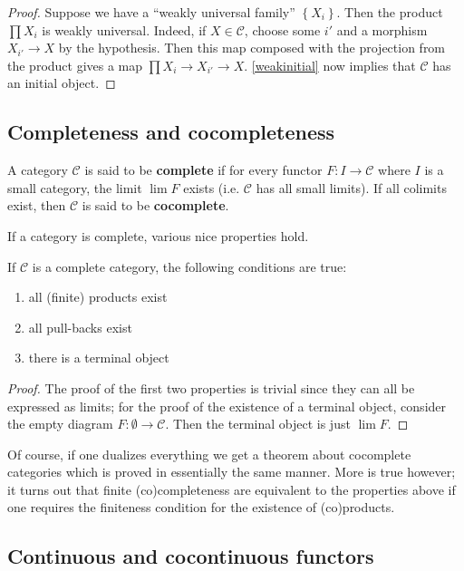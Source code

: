 \begin{proposition}
\begin{proof}
Suppose we have a ``weakly universal family'' $\left\{X_i\right\}$. Then the
product $\prod X_i$ is weakly universal. Indeed, if $X \in \mathcal{C}$,
choose some $i'$ and a morphism $X_{i'} \to X$ by the hypothesis. Then this map
composed with the projection from the product gives a map  $\prod X_i \to
X_{i'} \to X$.
\cref{weakinitial} now implies that $\mathcal{C}$ has an initial object.
\end{proof}

\subsection{Completeness and cocompleteness}
\begin{definition}\label{completecat} A category $\mathcal{C}$ is said to be \textbf{complete} if for every
functor $F:I\rightarrow \mathcal{C}$ where $I$ is a small category, the limit
$\lim F$ exists (i.e. $\mathcal{C}$ has all small limits). If all colimits exist, then $\mathcal{C}$ is said to be
\textbf{cocomplete}.
\end{definition}

If a category is complete, various nice properties hold.
\begin{proposition} If $\mathcal{C}$ is a complete category, the following
conditions are true:
\begin{enumerate}
\item{all (finite) products exist}
\item{all pull-backs exist}
\item{there is a terminal object}
\end{enumerate}
\end{proposition}
\begin{proof} The proof of the first two properties is trivial since they can
all be expressed as limits; for the proof of the existence of a terminal
object, consider the empty diagram $F:\emptyset \rightarrow \mathcal{C}$. Then
the
terminal object is just $\lim F$.
\end{proof}

Of course, if one dualizes everything we get a theorem about cocomplete
categories which is proved in essentially the same manner. More is true
however; it turns out that finite (co)completeness are equivalent to the
properties above if one requires the finiteness condition for the existence of
(co)products.

\subsection{Continuous and cocontinuous functors}

\end{proposition}
